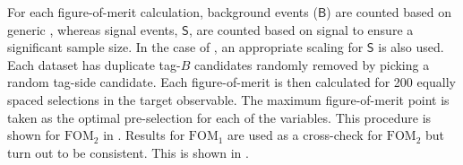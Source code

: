 For each figure-of-merit calculation, background events ($\mathsf{B}$) are counted based on generic \MC,
whereas signal events, $\mathsf{S}$, are counted based on signal \MC to ensure a significant sample size.
In the case of , an appropriate scaling for $\mathsf{S}$ is also used.
Each dataset has duplicate tag-$B$ candidates randomly removed by picking a random tag-side candidate.
Each figure-of-merit is then calculated for 200 equally spaced selections in the target observable.
The maximum figure-of-merit point is taken as the optimal pre-selection for each of the variables.
This procedure is shown for $\mathrm{FOM}_2$ in .
Results for $\mathrm{FOM}_1$ are used as a cross-check for $\mathrm{FOM_2}$ but turn out to be consistent.
This is shown in .
\begin{figure}[htbp!]
    \centering
\end{figure}
